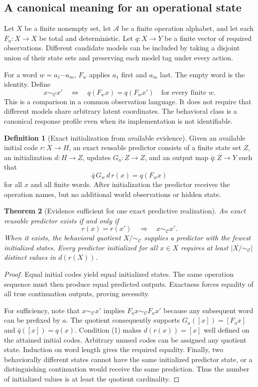 \documentclass[11pt,letterpaper]{article}
\theoremstyle{plain}
\newtheorem{theorem}{Theorem}[section]
\theoremstyle{definition}
\newtheorem{definition}[theorem]{Definition}
\newcommand{\A}{\mathcal A}\newcommand{\C}{\mathcal C}\newcommand{\E}{\mathcal E}
\begin{document}
\subsection{A canonical meaning for an operational state}
Let $X$ be a finite nonempty set, let $\A$ be a finite operation alphabet, and let each $F_a:X\to X$ be total and deterministic. Let $q:X\to Y$ be a finite vector of required observations. Different candidate models can be included by taking a disjoint union of their state sets and preserving each model tag under every action.

For a word $w=a_1\cdots a_m$, $F_w$ applies $a_1$ first and $a_m$ last. The empty word is the identity. Define
\[
x\sim_\C x'\quad\Longleftrightarrow\quad
q(F_wx)=q(F_wx')\quad\text{for every finite }w.
\]
This is a comparison in a common observation language. It does not require that different models share arbitrary latent coordinates. The behavioral class is a canonical response profile even when its implementation is not identifiable.

\begin{definition}[Exact initialization from available evidence]\label{def:initialization}
Given an available initial code $r:X\to H$, an exact reusable predictor consists of a finite state set $Z$, an initialization $d:H\to Z$, updates $G_a:Z\to Z$, and an output map $\bar q:Z\to Y$ such that
\[
\bar q\,G_w\,d\,r(x)=q(F_wx)
\]
for all $x$ and all finite words. After initialization the predictor receives the operation names, but no additional world observations or hidden state.
\end{definition}

\begin{theorem}[Evidence sufficient for one exact predictive realization]\label{thm:grounding}
An exact reusable predictor exists if and only if
\[
r(x)=r(x')\quad\Longrightarrow\quad x\sim_\C x'.\tag{1}
\]
When it exists, the behavioral quotient $X/{\sim_\C}$ supplies a predictor with the fewest initialized states. Every predictor initialized for all $x\in X$ requires at least $|X/{\sim_\C}|$ distinct values in $d(r(X))$.
\end{theorem}
\begin{proof}
Equal initial codes yield equal initialized states. The same operation sequence must then produce equal predicted outputs. Exactness forces equality of all true continuation outputs, proving necessity.

For sufficiency, note that $x\sim_\C x'$ implies $F_ax\sim_\C F_ax'$ because any subsequent word can be prefixed by $a$. The quotient consequently supports $G_a([x])=[F_ax]$ and $\bar q([x])=q(x)$. Condition (1) makes $d(r(x))=[x]$ well defined on the attained initial codes. Arbitrary unused codes can be assigned any quotient state. Induction on word length gives the required equality. Finally, two behaviorally different states cannot have the same initialized predictor state, or a distinguishing continuation would receive the same prediction. Thus the number of initialized values is at least the quotient cardinality.
\end{proof}
\end{document}
